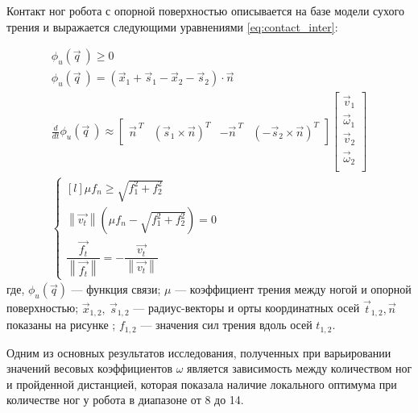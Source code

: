 Контакт ног робота с опорной поверхностью  описывается на базе модели сухого трения и выражается следующими уравнениями \eqref{eq:contact_inter}:

\begin{align}
    \label{eq:contact_inter}
    \phi_u(\vec{q}\ ) \geqslant 0 \\ 
                        \phi_u(\vec{q}\ ) = (\vec{x}_1 + \vec{s}_1 - \vec{x}_2 - \vec{s}_2) \cdot \vec{n} \\
                        \frac{d }{d t}\phi_u(\vec{q}\ ) \approx \begin{bmatrix}
                            \vec{n}^{\ T} & (\vec{s}_1 \times \vec{n})^T & -\vec{n}^{\ T} & (-\vec{s}_2 \times \vec{n})^T
                        \end{bmatrix} \begin{bmatrix}
                            \vec{v}_1\\ 
                        \vec{\omega}_1\\ 
                        \vec{v}_2\\
                        \vec{\omega}_2\\
                        \end{bmatrix} \\
\left\{\begin{matrix*}[l]
\mu f_n \geqslant \sqrt{f_1^2 + f_2^2}\\ 
\left\lVert \vec{v_t}\right\rVert (\mu f_n - \sqrt{f_1^2 + f_2^2}) = 0\\
\dfrac{\vec{f_t}}{\left\lVert \vec{f_t}\right\rVert } = - \dfrac{\vec{v_t}}{\left\lVert \vec{v_t}\right\rVert }
\end{matrix*}\right.
\end{align}
где, $\phi_u(\vec{q})$ --- функция связи; $\mu $ --- коэффициент трения между ногой и опорной поверхностью; $\vec{x}_{1,2},\ \vec{s}_{1,2}$ --- радиус-векторы и орты координатных осей $\vec{t}_{1,2}, \vec{n}$ показаны на рисунке ; $ f_{1,2} $ --- значения сил трения вдоль осей $t_{1,2}$.


Одним из основных результатов исследования, полученных при варьировании значений весовых коэффициентов $\omega$ является зависимость между количеством ног и пройденной дистанцией, которая показала наличие локального оптимума при количестве ног у робота в диапазоне от 8 до 14. 

